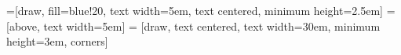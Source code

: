 
=[draw, fill=blue!20, text width=5em, 
    text centered, minimum height=2.5em]
 = [above, text width=5em]
 = [draw, text centered, text width=30em,  minimum height=3em, corners]
\def\blockdist{2.3}
\def\edgedist{2.5}

